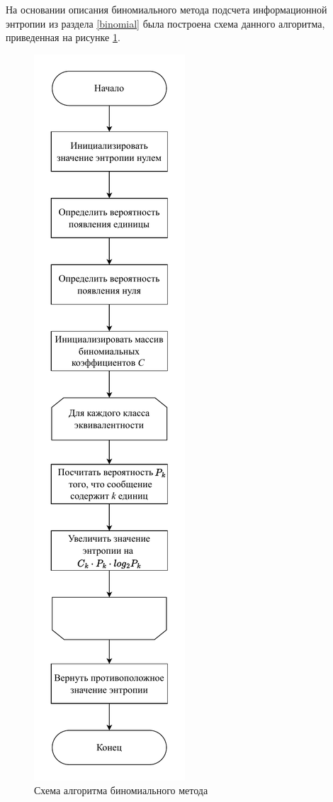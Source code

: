 На основании описания биномиального метода подсчета информационной энтропии из раздела \ref{binomial} была построена схема данного алгоритма, приведенная на рисунке \ref{img:get-binomial-entropy}.

\begin{figure}[H]
	\begin{center}
		\includegraphics[scale=0.7]{inc/img/get-binomial-entropy.pdf}
	\end{center}
	\captionsetup{justification=centering}
	\caption{Схема алгоритма биномиального метода}
	\label{img:get-binomial-entropy}
\end{figure}

